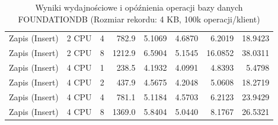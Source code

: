 \begin{table}[ht]
{\begin{tabular}{llcrrrrr}
Zapis (Insert) & 2 CPU & 4 & 782.9 & 5.1069 & 4.6870 & 6.2019 & 18.9423 \\
Zapis (Insert) & 2 CPU & 8 & 1212.9 & 6.5904 & 5.1545 & 16.0852 & 38.0311 \\
Zapis (Insert) & 4 CPU & 1 & 238.5 & 4.1932 & 4.0991 & 4.8393 & 5.4798 \\
Zapis (Insert) & 4 CPU & 2 & 437.9 & 4.5675 & 4.2048 & 5.0608 & 18.2719 \\
Zapis (Insert) & 4 CPU & 4 & 781.1 & 5.1184 & 4.5703 & 6.2123 & 23.9429 \\
Zapis (Insert) & 4 CPU & 8 & 1369.0 & 5.8404 & 5.0440 & 8.1767 & 26.5321 \\
\bottomrule
\end{tabular}%
}
\caption{Wyniki wydajnościowe i opóźnienia operacji bazy danych FOUNDATIONDB (Rozmiar rekordu: 4 KB, 100k operacji/klient)}
\label{tab:latency_foundationdb_medium_100000}
\end{table}
